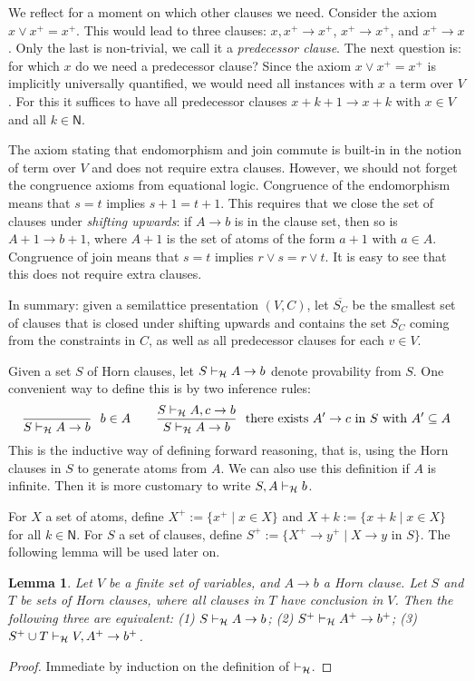 \documentclass[11pt,a4paper]{article}
\newtheorem{lemma}[theorem]{Lemma}
\newcommand{\N}{\mathsf{N}}
\newcommand\set[1]{\{#1\}}
\newcommand\prvH{\vdash_{\cal H}}
\newcommand\upS[1]{\overline{S_{#1}}}
\newcommand{\FYI}[1]{{\color{red}#1}}
\begin{document}
We reflect for a moment on which other clauses we need.
Consider the axiom $x \vee x^+ = x^+$. This would lead to three
clauses: $x,x^+ \to x^+$, $x^+ \to x^+$, and $x^+ \to x$.
Only the last is non-trivial, we call it a \emph{predecessor clause}.
The next question is: for which $x$ do we need a predecessor clause?
Since the axiom $x \vee x^+ = x^+$ is implicitly universally quantified,
we would need all instances with $x$ a term over $V$.
For this it suffices to have all predecessor clauses
$x+k+1 \to x+k$ with $x\in V$ and all $k\in \N$.

The axiom stating that endomorphism and join commute is built-in
in the notion of term over $V$ and does not require extra clauses.
However, we should not forget the congruence axioms from
equational logic. Congruence of the endomorphism means that $s=t$
implies $s+1=t+1$. This requires that we close the set of clauses
under \emph{shifting upwards}: if $A\to b$ is in the clause set,
then so is $A+1\to b+1$, where $A+1$ is the set of atoms of
the form $a+1$ with $a\in A$. 
Congruence of join means that $s=t$ implies $r\vee s=r\vee t$.
It is easy to see that this does not require extra clauses. 

In summary: given a semilattice presentation $(V,C)$,
let $\upS{C}$ be the smallest set of clauses that 
is closed under shifting upwards and contains
the set $S_C$ coming from the constraints in $C$,
as well as all predecessor clauses for each $v\in V$. 

Given a set $S$ of Horn clauses,
let $S\prvH A\to b$ denote provability from $S$.
One convenient way to define this is by \FYI{two inference rules:
\[
\frac{~}{S\prvH A\to b}~~\text{$b\in A$}
\quad\quad%
\frac{S\prvH A,c\to b}{S\prvH A\to b}~~\text{there exists $A'\to c$ in $S$ with $A'\subseteq A$}
\]
}
This is the inductive way of defining forward reasoning,
that is, using the Horn clauses in $S$ to generate atoms from $A$.
We can also use this definition if $A$ is infinite.
Then it is more customary to write $S,A \prvH b$.

For $X$ a set of atoms, define $X^+ := \set{x^+ \mid x\in X}$
and $X+k := \set{x+k \mid x\in X}$ for all $k\in\N$.
For $S$ a set of clauses, define 
$S^+ := \set{X^+\to y^+ \mid \text{$X\to y$ in $S$}}$.
The following lemma will be used later on.

\begin{lemma}\label{lem:shift-up}
Let $V$ be a finite set of variables, and $A\to b$ a Horn clause.
Let $S$ and $T$ be sets of Horn clauses, where all clauses in $T$ 
have conclusion \emph{in} $V$. Then the following three are equivalent:
(1) $S\prvH A\to b$; (2) $S^+\prvH A^+\to b^+$; (3) $S^+ \cup T \prvH V,A^+\to b^+$.
\end{lemma} 
\begin{proof} 
Immediate by induction on the definition of $\prvH$.
\end{proof}
\end{document}
